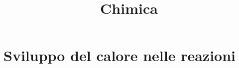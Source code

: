 \documentclass[preview]{standalone}
\begin{document}
\title{Chimica}
\genpage

\section{Sviluppo del calore nelle reazioni}

%
\end{document}
